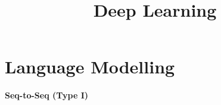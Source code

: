 





\newcommand{\titlefigure}{plots/image_caption.png}
\newcommand{\learninggoals}{
  \item Understand application to Language Modelling
  \item Get to know Encoder-Decoder architectures
  \item Learn about further RNN applications
}

\title{Deep Learning}
\date{}








\section{Language Modelling}

%
%  


\begin{frame}

\vspace{15mm}
\hspace{25mm} \textbf{\LARGE{Seq-to-Seq (Type I)}}
\begin{figure}
      \centering

  \end{figure}
  
\end{frame}

